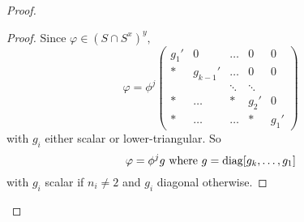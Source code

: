 \begin{proof}
\begin{proof}


Since $\varphi \in (S \cap S^x)^y,$
$$
\varphi = \phi^j 
\begin{pmatrix}
g_1'     & 0 & \ldots & 0 & 0 \\
*          &    g_{k-1}'  & \ldots & 0 & 0 \\
     &     & \ddots & \ddots  &    \\
   *    &    \ldots& * & g_{2}' & 0 \\
      *    &   \ldots        & \ldots& * & g_{1}'
\end{pmatrix}
$$ with $g_i$ either scalar or lower-triangular. So 
\begin{equation}
\label{phidiagG}
\varphi =\phi^j g \text{ where } g=\mathrm{diag}[g_k, \ldots, g_1]
\end{equation}
 with $g_i$ scalar if $n_i \ne 2$ and $g_i$ diagonal otherwise. 
\end{proof}

\medskip


\end{proof}
